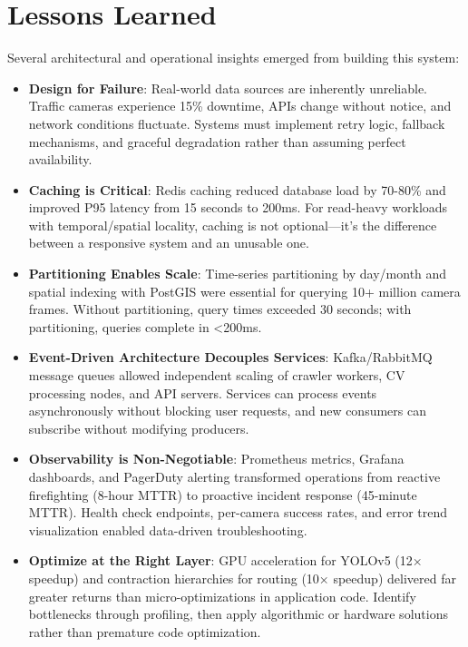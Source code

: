 \section{Lessons Learned}

Several architectural and operational insights emerged from building this system:

\begin{itemize}
    \item \textbf{Design for Failure}: Real-world data sources are inherently unreliable. Traffic cameras experience 15\% downtime, APIs change without notice, and network conditions fluctuate. Systems must implement retry logic, fallback mechanisms, and graceful degradation rather than assuming perfect availability.
    
    \item \textbf{Caching is Critical}: Redis caching reduced database load by 70-80\% and improved P95 latency from 15 seconds to 200ms. For read-heavy workloads with temporal/spatial locality, caching is not optional—it's the difference between a responsive system and an unusable one.
    
    \item \textbf{Partitioning Enables Scale}: Time-series partitioning by day/month and spatial indexing with PostGIS were essential for querying 10+ million camera frames. Without partitioning, query times exceeded 30 seconds; with partitioning, queries complete in <200ms.
    
    \item \textbf{Event-Driven Architecture Decouples Services}: Kafka/RabbitMQ message queues allowed independent scaling of crawler workers, CV processing nodes, and API servers. Services can process events asynchronously without blocking user requests, and new consumers can subscribe without modifying producers.
    
    \item \textbf{Observability is Non-Negotiable}: Prometheus metrics, Grafana dashboards, and PagerDuty alerting transformed operations from reactive firefighting (8-hour MTTR) to proactive incident response (45-minute MTTR). Health check endpoints, per-camera success rates, and error trend visualization enabled data-driven troubleshooting.
    
    \item \textbf{Optimize at the Right Layer}: GPU acceleration for YOLOv5 (12× speedup) and contraction hierarchies for routing (10× speedup) delivered far greater returns than micro-optimizations in application code. Identify bottlenecks through profiling, then apply algorithmic or hardware solutions rather than premature code optimization.
\end{itemize}

